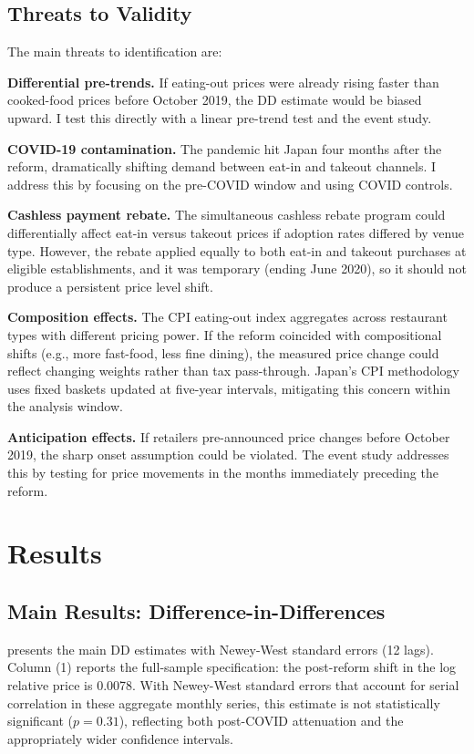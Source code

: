 \documentclass[12pt]{article}
\begin{document}
\subsection{Threats to Validity}
\label{sec:threats}

The main threats to identification are:

\textbf{Differential pre-trends.} If eating-out prices were already rising faster than cooked-food prices before October 2019, the DD estimate would be biased upward. I test this directly with a linear pre-trend test and the event study.

\textbf{COVID-19 contamination.} The pandemic hit Japan four months after the reform, dramatically shifting demand between eat-in and takeout channels. I address this by focusing on the pre-COVID window and using COVID controls.

\textbf{Cashless payment rebate.} The simultaneous cashless rebate program could differentially affect eat-in versus takeout prices if adoption rates differed by venue type. However, the rebate applied equally to both eat-in and takeout purchases at eligible establishments, and it was temporary (ending June 2020), so it should not produce a persistent price level shift.

\textbf{Composition effects.} The CPI eating-out index aggregates across restaurant types with different pricing power. If the reform coincided with compositional shifts (e.g., more fast-food, less fine dining), the measured price change could reflect changing weights rather than tax pass-through. Japan's CPI methodology uses fixed baskets updated at five-year intervals, mitigating this concern within the analysis window.

\textbf{Anticipation effects.} If retailers pre-announced price changes before October 2019, the sharp onset assumption could be violated. The event study addresses this by testing for price movements in the months immediately preceding the reform.


\section{Results}
\label{sec:results}

\subsection{Main Results: Difference-in-Differences}

 presents the main DD estimates with Newey-West standard errors (12 lags). Column (1) reports the full-sample specification: the post-reform shift in the log relative price is 0.0078. With Newey-West standard errors that account for serial correlation in these aggregate monthly series, this estimate is not statistically significant ($p = 0.31$), reflecting both post-COVID attenuation and the appropriately wider confidence intervals.
\end{document}
